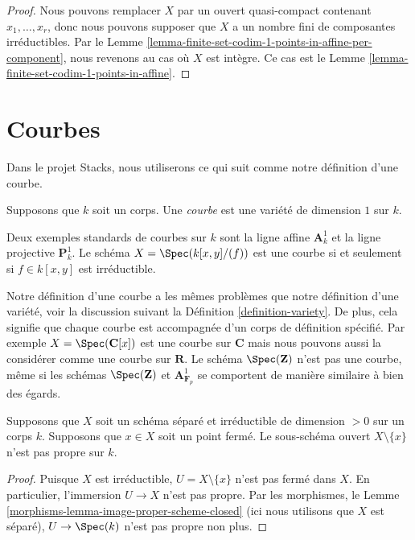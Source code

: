 \begin{proof}
Nous pouvons remplacer $X$ par un ouvert quasi-compact contenant $x_1,
\ldots, x_r$, donc nous pouvons supposer que $X$ a un nombre fini de
composantes irréductibles. Par le Lemme
\ref{lemma-finite-set-codim-1-points-in-affine-per-component}, nous revenons au cas où
$X$ est intègre. Ce cas est le Lemme \ref{lemma-finite-set-codim-1-points-in-affine}.
\end{proof}





\section{Courbes}
\label{section-curves}

\noindent
Dans le projet Stacks, nous utiliserons ce
qui suit comme notre définition d'une courbe.

\begin{definition}
\label{definition-curve}
Supposons que $k$ soit un corps. Une {\it  courbe } est une variété de dimension $1$ sur $k$.
\end{definition}

\noindent
Deux exemples standards de courbes sur $k$ sont la ligne affine
$\mathbf{A}^1_k$ et la ligne projective $\mathbf{P}^1_k$. Le schéma $X =
\Spec(k[x, y]/(f))$ est une courbe si et seulement si $f \in k[x, y]$ est irréductible.

\medskip\noindent
Notre définition d'une courbe a les mêmes problèmes que notre définition d'une
variété, voir la discussion suivant la Définition \ref{definition-variety}. De
plus, cela signifie que chaque courbe est accompagnée d'un corps de définition
spécifié. Par exemple $X = \Spec(\mathbf{C}[x])$ est une courbe sur $\mathbf{C}$
mais nous pouvons aussi la considérer comme une courbe sur $\mathbf{R}$. Le schéma
$\Spec(\mathbf{Z})$ n'est pas une courbe, même si les schémas $\Spec(\mathbf{Z})$ et
$\mathbf{A}^1_{\mathbf{F}_p}$ se comportent de manière similaire à bien des égards.

\begin{lemma}
\label{lemma-proper-minus-point}
Supposons que $X$ soit un schéma séparé et irréductible de dimension
$> 0$ sur un corps $k$. Supposons que $x \in X$ soit un point fermé.
Le sous-schéma ouvert $X \setminus \{x\}$ n'est pas propre sur $k$.
\end{lemma}

\begin{proof}
Puisque $X$ est irréductible, $U = X \setminus \{x\}$ n'est pas fermé dans
$X$. En particulier, l'immersion $U \to X$ n'est pas propre. Par les
morphismes, le Lemme \ref{morphisms-lemma-image-proper-scheme-closed} (ici
nous utilisons que $X$ est séparé), $U \to \Spec(k)$ n'est pas propre non plus.
\end{proof}

